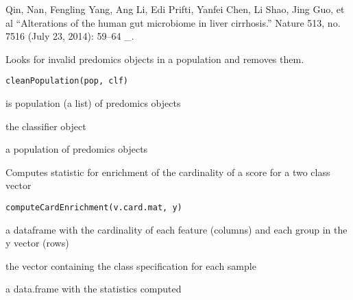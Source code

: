 \documentclass[a4paper]{book}
\begin{document}
%
\begin{Author}
Qin, Nan, Fengling Yang, Ang Li, Edi Prifti, Yanfei Chen, Li Shao, Jing Guo, et al “Alterations of the human gut microbiome in liver cirrhosis.” Nature 513, no. 7516 (July 23, 2014): 59–64 \_.
\end{Author}
%
\begin{Description}
Looks for invalid predomics objects in a population and removes them.
\end{Description}
%
\begin{Usage}
\begin{verbatim}
cleanPopulation(pop, clf)
\end{verbatim}
\end{Usage}
%
\begin{Arguments}
\begin{ldescription}
\item[\code{pop:}] is population (a list) of predomics objects

\item[\code{clf:}] the classifier object
\end{ldescription}
\end{Arguments}
%
\begin{Value}
a population of predomics objects
\end{Value}
%
\begin{Description}
Computes statistic for enrichment of the cardinality of a score for a two class vector
\end{Description}
%
\begin{Usage}
\begin{verbatim}
computeCardEnrichment(v.card.mat, y)
\end{verbatim}
\end{Usage}
%
\begin{Arguments}
\begin{ldescription}
\item[\code{v.card.mat:}] a dataframe with the cardinality of each feature (columns) and each group in the y vector (rows)

\item[\code{y:}] the vector containing the class specification for each sample
\end{ldescription}
\end{Arguments}
%
\begin{Value}
a data.frame with the statistics computed
\end{Value}
\end{document}
